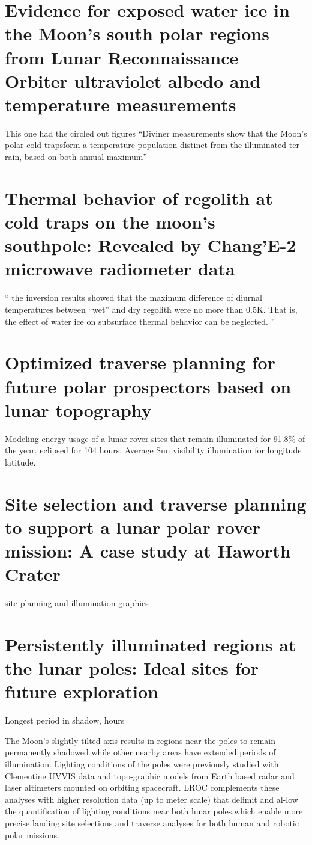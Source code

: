 \documentclass[prl,onecolumn]{revtex4-1}  %
\begin{document}
\section{Evidence for exposed water ice in the Moon's south polar regions from Lunar Reconnaissance Orbiter ultraviolet albedo and temperature measurements}
This one had the circled out figures
``Diviner measurements show that the Moon’s polar cold trapsform a temperature population distinct from the illuminated ter-rain, based on both annual maximum''
\citep{Hayne}


\section{Thermal behavior of regolith at cold traps on the moon's southpole: Revealed by Chang'E-2 microwave radiometer data}
`` the inversion results showed that the maximum difference of diurnal temperatures between “wet” and dry regolith were no more than 0.5K. That is, the effect of water ice on subsurface thermal behavior can be neglected. ''
\citep{Wei}


\section{Optimized traverse planning for future polar prospectors based on lunar topography}
Modeling energy usage of a lunar rover
sites that remain illuminated for 91.8\% of the year. eclipsed for 104 hours.
Average Sun visibility illumination for longitude latitude.
\citep{Speyerer}

\section{Site selection and traverse planning to support a lunar polar rover mission: A case study at Haworth Crater}
site planning and illumination graphics
\citep{Heldmann}

\section{Persistently illuminated regions at the lunar poles: Ideal sites for future exploration}
Longest period in shadow, hours

The Moon’s slightly tilted axis results in regions near the poles to remain permanently shadowed while other nearby areas have extended periods of illumination. Lighting conditions of the poles were previously studied with Clementine UVVIS data and topo-graphic models from Earth based radar and laser altimeters mounted on orbiting spacecraft. LROC complements these analyses with higher resolution data (up to meter scale) that delimit and al-low the quantification of lighting conditions near both lunar poles,which enable more precise landing site selections and traverse analyses for both human and robotic polar missions.
\citep{Speyerer}
\end{document}
